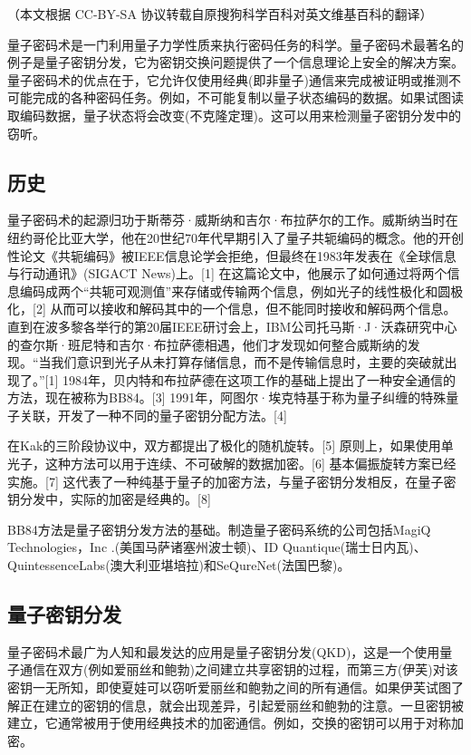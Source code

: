 
（本文根据 CC-BY-SA 协议转载自原搜狗科学百科对英文维基百科的翻译）

量子密码术是一门利用量子力学性质来执行密码任务的科学。量子密码术最著名的例子是量子密钥分发，它为密钥交换问题提供了一个信息理论上安全的解决方案。量子密码术的优点在于，它允许仅使用经典(即非量子)通信来完成被证明或推测不可能完成的各种密码任务。例如，不可能复制以量子状态编码的数据。如果试图读取编码数据，量子状态将会改变(不克隆定理)。这可以用来检测量子密钥分发中的窃听。

\subsection{历史}
量子密码术的起源归功于斯蒂芬·威斯纳和吉尔·布拉萨尔的工作。威斯纳当时在纽约哥伦比亚大学，他在20世纪70年代早期引入了量子共轭编码的概念。他的开创性论文《共轭编码》被IEEE信息论学会拒绝，但最终在1983年发表在《全球信息与行动通讯》(SIGACT News)上。[1] 在这篇论文中，他展示了如何通过将两个信息编码成两个“共轭可观测值”来存储或传输两个信息，例如光子的线性极化和圆极化，[2] 从而可以接收和解码其中的一个信息，但不能同时接收和解码两个信息。直到在波多黎各举行的第20届IEEE研讨会上，IBM公司托马斯·J·沃森研究中心的查尔斯·班尼特和吉尔·布拉萨德相遇，他们才发现如何整合威斯纳的发现。“当我们意识到光子从未打算存储信息，而不是传输信息时，主要的突破就出现了。”[1] 1984年，贝内特和布拉萨德在这项工作的基础上提出了一种安全通信的方法，现在被称为BB84。[3] 1991年，阿图尔·埃克特基于称为量子纠缠的特殊量子关联，开发了一种不同的量子密钥分配方法。[4]

在Kak的三阶段协议中，双方都提出了极化的随机旋转。[5] 原则上，如果使用单光子，这种方法可以用于连续、不可破解的数据加密。[6] 基本偏振旋转方案已经实施。[7] 这代表了一种纯基于量子的加密方法，与量子密钥分发相反，在量子密钥分发中，实际的加密是经典的。[8]

BB84方法是量子密钥分发方法的基础。制造量子密码系统的公司包括MagiQ Technologies，Inc .(美国马萨诸塞州波士顿)、ID Quantique(瑞士日内瓦)、QuintessenceLabs(澳大利亚堪培拉)和SeQureNet(法国巴黎)。

\subsection{量子密钥分发}
量子密码术最广为人知和最发达的应用是量子密钥分发(QKD)，这是一个使用量子通信在双方(例如爱丽丝和鲍勃)之间建立共享密钥的过程，而第三方(伊芙)对该密钥一无所知，即使夏娃可以窃听爱丽丝和鲍勃之间的所有通信。如果伊芙试图了解正在建立的密钥的信息，就会出现差异，引起爱丽丝和鲍勃的注意。一旦密钥被建立，它通常被用于使用经典技术的加密通信。例如，交换的密钥可以用于对称加密。

